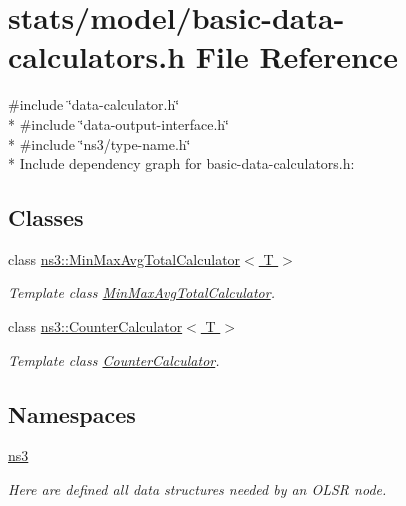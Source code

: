\hypertarget{basic-data-calculators_8h}{}\section{stats/model/basic-\/data-\/calculators.h File Reference}
\label{basic-data-calculators_8h}
{\ttfamily \#include \char`\"{}data-\/calculator.\+h\char`\"{}}\\*
{\ttfamily \#include \char`\"{}data-\/output-\/interface.\+h\char`\"{}}\\*
{\ttfamily \#include \char`\"{}ns3/type-\/name.\+h\char`\"{}}\\*
Include dependency graph for basic-\/data-\/calculators.h\+:
\subsection*{Classes}
\begin{DoxyCompactItemize}
\item 
class \hyperlink{classns3_1_1MinMaxAvgTotalCalculator}{ns3\+::\+Min\+Max\+Avg\+Total\+Calculator$<$ T $>$}
\begin{DoxyCompactList}\small\item\em Template class \hyperlink{classns3_1_1MinMaxAvgTotalCalculator}{Min\+Max\+Avg\+Total\+Calculator}. \end{DoxyCompactList}\item 
class \hyperlink{classns3_1_1CounterCalculator}{ns3\+::\+Counter\+Calculator$<$ T $>$}
\begin{DoxyCompactList}\small\item\em Template class \hyperlink{classns3_1_1CounterCalculator}{Counter\+Calculator}. \end{DoxyCompactList}\end{DoxyCompactItemize}
\subsection*{Namespaces}
\begin{DoxyCompactItemize}
\item 
 \hyperlink{namespacens3}{ns3}
\begin{DoxyCompactList}\small\item\em Here are defined all data structures needed by an O\+L\+SR node. \end{DoxyCompactList}\end{DoxyCompactItemize}
